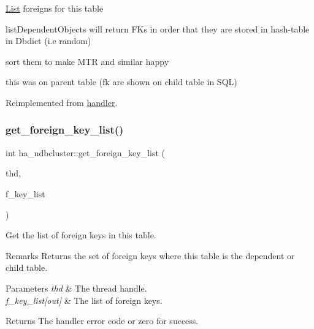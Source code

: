 \mbox{\hyperlink{classList}{List}} foreigns for this table

list\+Dependent\+Objects will return FK\textquotesingle{}s in order that they are stored in hash-\/table in Dbdict (i.\+e random)

sort them to make M\+TR and similar happy

this was on parent table (fk are shown on child table in S\+QL)

Reimplemented from \mbox{\hyperlink{classhandler}{handler}}.

\mbox{\label{classha__ndbcluster_a3b97152a2ce0d7e7622de70daae4171b}} 
\subsubsection{\texorpdfstring{get\+\_\+foreign\+\_\+key\+\_\+list()}{get\_foreign\_key\_list()}}
{\footnotesize\ttfamily int ha\+\_\+ndbcluster\+::get\+\_\+foreign\+\_\+key\+\_\+list (\begin{DoxyParamCaption}\item[{T\+HD $\ast$}]{thd,  }\item[{\mbox{\hyperlink{classList}{List}}$<$ \mbox{\hyperlink{structst__foreign__key__info}{F\+O\+R\+E\+I\+G\+N\+\_\+\+K\+E\+Y\+\_\+\+I\+N\+FO}} $>$ $\ast$}]{f\+\_\+key\+\_\+list }\end{DoxyParamCaption})\hspace{0.3cm}{\ttfamily [virtual]}}

Get the list of foreign keys in this table.

\begin{DoxyRemark}{Remarks}
Returns the set of foreign keys where this table is the dependent or child table.
\end{DoxyRemark}

\begin{DoxyParams}{Parameters}
{\em thd} & The thread handle. \\
\hline
{\em f\+\_\+key\+\_\+list\mbox{[}out\mbox{]}} & The list of foreign keys.\\
\hline
\end{DoxyParams}
\begin{DoxyReturn}{Returns}
The handler error code or zero for success. 
\end{DoxyReturn}


